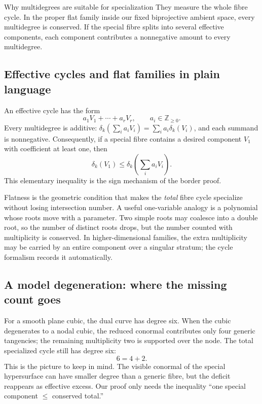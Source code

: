 \documentclass[acmsmall,screen,nonacm]{acmart}
\theoremstyle{definition}
\theoremstyle{remark}
\newcommand{\pdeg}{\delta}
\begin{document}
\begin{intuitionbox}{Why multidegrees are suitable for specialization}
They measure the whole fibre cycle.  In the proper flat family inside our fixed biprojective ambient space, every multidegree is conserved.  If the special fibre splits into several effective components, each component contributes a nonnegative amount to every multidegree.
\end{intuitionbox}

\subsection{Effective cycles and flat families in plain language}

An effective cycle has the form
\[
  a_1V_1+\cdots+a_rV_r,\qquad a_i\in\mathbb Z_{\ge0}.
\]
Every multidegree is additive:
$\pdeg_k(\sum_i a_iV_i)=\sum_i a_i\pdeg_k(V_i)$, and each summand is
nonnegative.  Consequently, if a special fibre contains a desired component
$V_1$ with coefficient at least one, then
\[
  \pdeg_k(V_1)\le \pdeg_k\!\left(\sum_i a_iV_i\right).
\]
This elementary inequality is the sign mechanism of the border proof.

Flatness is the geometric condition that makes the \emph{total} fibre cycle
specialize without losing intersection number.  A useful one-variable analogy
is a polynomial whose roots move with a parameter.  Two simple roots may
coalesce into a double root, so the number of distinct roots drops, but the
number counted with multiplicity is conserved.  In higher-dimensional
families, the extra multiplicity may be carried by an entire component over a
singular stratum; the cycle formalism records it automatically.

\subsection{A model degeneration: where the missing count goes}

For a smooth plane cubic, the dual curve has degree six.  When the cubic degenerates to a nodal cubic, the reduced conormal contributes only four generic tangencies; the remaining multiplicity two is supported over the node.  The total specialized cycle still has degree six:
\[
  6=4+2.
\]
This is the picture to keep in mind.  The visible conormal of the special hypersurface can have smaller degree than a generic fibre, but the deficit reappears as effective excess.  Our proof only needs the inequality ``one special component $\le$ conserved total.''
\end{document}
